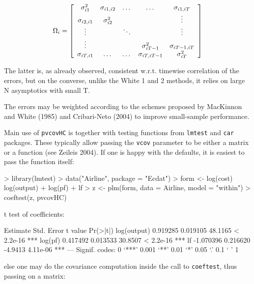 \documentclass[a4paper]{article}
\begin{document}
\begin{equation}
 \label{eq:omegaArellano}
 \Omega_i=
 \left[ \begin{array}{c c c c c}
 \sigma_{i1}^2 & \sigma_{i1,i2}  & \dots & \dots & \sigma_{i1,iT} \\
 \sigma_{i2,i1} & \sigma_{i2}^2 & & & \vdots \\
 \vdots & & \ddots & & \vdots \\
 \vdots & & & \sigma_{iT-1}^2 & \sigma_{iT-1,iT} \\
 \sigma_{iT,i1} & \dots & \dots & \sigma_{iT,iT-1} & \sigma_{iT}^2 \\
 \end{array} \right]
\end{equation}

The latter is, as already observed, consistent w.r.t. timewise correlation of the errors, but on the converse, unlike the White 1 and 2 methods, it relies on large N asymptotics with small T. 

The errors may be weighted according to the schemes proposed by MacKinnon and White (1985) and Cribari-Neto (2004) to improve small-sample performance. 

Main use of \texttt{pvcovHC} is together with testing functions from \texttt{lmtest} and \texttt{car} packages. These typically allow passing the \texttt{vcov} parameter to be either a matrix or a function (see Zeileis 2004). If one is happy with the defaults, it is easiest to pass the function itself:

\begin{Schunk}
\begin{Sinput}
> library(lmtest)
> data("Airline", package = "Ecdat")
> form <- log(cost) ~ log(output) + log(pf) + lf
> z <- plm(form, data = Airline, model = "within")
> coeftest(z, pvcovHC)
\end{Sinput}
\begin{Soutput}
t test of coefficients:

             Estimate Std. Error t value  Pr(>|t|)    
log(output)  0.919285   0.019105 48.1165 < 2.2e-16 ***
log(pf)      0.417492   0.013533 30.8507 < 2.2e-16 ***
lf          -1.070396   0.216620 -4.9413  4.11e-06 ***
---
Signif. codes:  0 ‘***’ 0.001 ‘**’ 0.01 ‘*’ 0.05 ‘.’ 0.1 ‘ ’ 1 
\end{Soutput}
\end{Schunk}

else one may do the covariance computation inside the call to \texttt{coeftest}, thus passing on a matrix:
\end{document}
